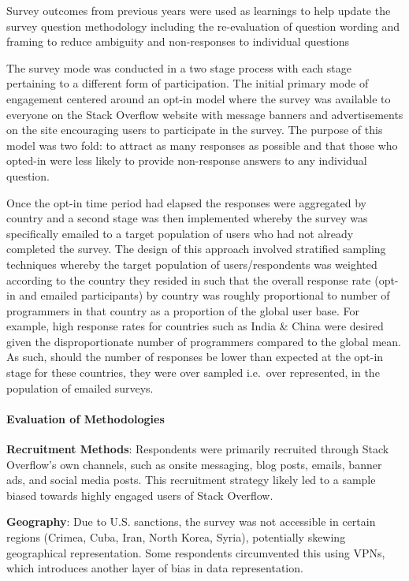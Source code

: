\documentclass[
  12pt,
]{article}
\begin{document}
Survey outcomes from previous years were used as learnings to help
update the survey question methodology including the re-evaluation of
question wording and framing to reduce ambiguity and non-responses to
individual questions

The survey mode was conducted in a two stage process with each stage
pertaining to a different form of participation. The initial primary
mode of engagement centered around an opt-in model where the survey was
available to everyone on the Stack Overflow website with message banners
and advertisements on the site encouraging users to participate in the
survey. The purpose of this model was two fold: to attract as many
responses as possible and that those who opted-in were less likely to
provide non-response answers to any individual question.

Once the opt-in time period had elapsed the responses were aggregated by
country and a second stage was then implemented whereby the survey was
specifically emailed to a target population of users who had not already
completed the survey. The design of this approach involved stratified
sampling techniques whereby the target population of users/respondents
was weighted according to the country they resided in such that the
overall response rate (opt-in and emailed participants) by country was
roughly proportional to number of programmers in that country as a
proportion of the global user base. For example, high response rates for
countries such as India \& China were desired given the disproportionate
number of programmers compared to the global mean. As such, should the
number of responses be lower than expected at the opt-in stage for these
countries, they were over sampled i.e.~over represented, in the
population of emailed surveys.

\hypertarget{evaluation-of-methodologies}{%
\paragraph{Evaluation of
Methodologies}\label{evaluation-of-methodologies}}

\textbf{Recruitment Methods}: Respondents were primarily recruited
through Stack Overflow's own channels, such as onsite messaging, blog
posts, emails, banner ads, and social media posts. This recruitment
strategy likely led to a sample biased towards highly engaged users of
Stack Overflow.

\textbf{Geography}: Due to U.S. sanctions, the survey was not accessible
in certain regions (Crimea, Cuba, Iran, North Korea, Syria), potentially
skewing geographical representation. Some respondents circumvented this
using VPNs, which introduces another layer of bias in data
representation.
\end{document}
